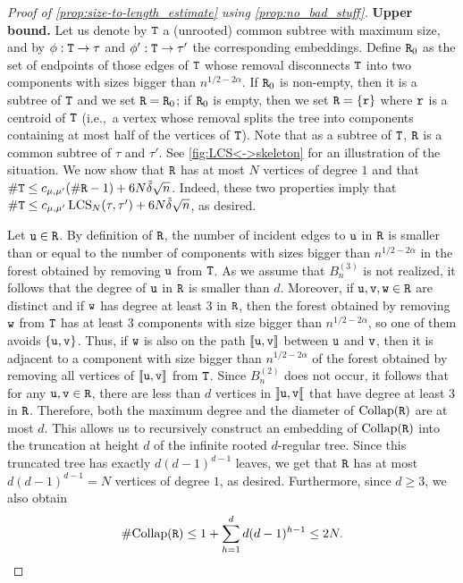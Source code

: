 \documentclass[11pt,reqno]{amsart}
\newcommand{\LCS}{\operatorname{LCS}}
\begin{document}
\begin{proof}[Proof of \cref{prop:size-to-length_estimate} using \cref{prop:no_bad_stuff}]
\medskip
\noindent \textbf{Upper bound.}
Let us denote by $\mathtt{T}$ a (unrooted) common subtree with maximum size, and by $\phi:\mathtt{T}\rightarrow \tau$ and $\phi':\mathtt{T}\rightarrow \tau'$ the corresponding embeddings. Define $\mathtt{R}_0$ as the set of endpoints of those edges of $\mathtt{T}$ whose removal disconnects $\mathtt{T}$ into two components with sizes bigger than $n^{1/2-2\alpha}$. If $\mathtt{R}_0$ is non-empty, then it is a subtree of $\mathtt{T}$ and we set $\mathtt{R}=\mathtt{R}_0$; if $\mathtt{R}_0$ is empty, then we set $\mathtt{R}=\{\mathtt{r}\}$ where $\mathtt{r}$ is a centroid of $\mathtt{T}$ (i.e.,~a vertex whose removal splits the tree into components containing at most half of the vertices of $\mathtt{T}$).
Note that as a subtree of $\mathtt{T}$, $\mathtt{R}$ is a common subtree of $\tau$ and $\tau'$. See \cref{fig:LCS<->skeleton} for an illustration of the situation. We now show that $\mathtt{R}$ has at most $N$ vertices of degree $1$ and that $\#\mathtt{T}\leq c_{\mu,\mu'}(\#\mathtt{R}-1) +6N\tilde{\delta}\sqrt{n}$. Indeed, these two properties imply that $\#\ttT\leq c_{\mu,\mu'}\LCS_N(\tau,\tau')+6N\tilde{\delta}\sqrt{n}$, as desired.

\medskip
Let $\mathtt{u}\in\mathtt{R}$. By definition of $\mathtt{R}$, the number of incident edges to $\mathtt{u}$ in $\mathtt{R}$ is smaller than or equal to the number of components with sizes bigger than $n^{1/2-2\alpha}$ in the forest obtained by removing $\mathtt{u}$ from $\mathtt{T}$. As we assume that $B_n^{(3)}$ is not realized, it follows that the degree of $\mathtt{u}$ in $\mathtt{R}$ is smaller than $d$. 
Moreover, if $\mathtt{u},\mathtt{v},\mathtt{w}\in\mathtt{R}$ are distinct and if $\mathtt{w}$ has degree at least $3$ in $\mathtt{R}$, then the forest obtained by removing $\mathtt{w}$ from $\mathtt{T}$ has at least $3$ components with size bigger than $n^{1/2-2\alpha}$, so one of them avoids $\{\mathtt{u},\mathtt{v}\}$. Thus, if $\mathtt{w}$ is also on the path $\llbracket \mathtt{u},\mathtt{v}\rrbracket$ between $\mathtt{u}$ and $\mathtt{v}$, then it is adjacent to a component with size bigger than $n^{1/2-2\alpha}$ of the forest obtained by removing all vertices of $\llbracket \mathtt{u},\mathtt{v}\rrbracket$ from $\mathtt{T}$. Since $B_n^{(2)}$ does not occur, it follows that for any $\mathtt{u},\mathtt{v}\in\mathtt{R}$, there are less than $d$ vertices in $\rrbracket\mathtt{u},\mathtt{v}\llbracket$ that have degree at least $3$ in $\mathtt{R}$. 
Therefore, both the maximum degree and the diameter of $\mathrm{Collap}(\mathtt{R})$ are at most $d$. This allows us to recursively construct an embedding of $\mathrm{Collap}(\mathtt{R})$ into the truncation at height $d$ of the infinite rooted $d$-regular tree. Since this truncated tree has exactly $d(d-1)^{d-1}$ leaves, we get that $\mathtt{R}$ has at most $d(d-1)^{d-1}=N$ vertices of degree $1$, as desired. Furthermore, since $d\geq 3$, we also obtain
\begin{equation}
\label{size_combinatorial_skeleton}
\#\mathrm{Collap}(\mathtt{R})\leq 1+\sum_{h=1}^d d(d-1)^{h-1}\leq 2N.
\end{equation}



\end{proof}
\end{document}
